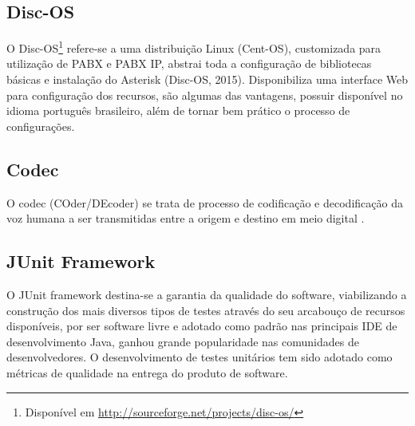 \subsection{Disc-OS}
O Disc-OS\footnote{Disponível em \url{http://sourceforge.net/projects/disc-os/}} refere-se a uma distribuição Linux (Cent-OS), customizada para utilização de PABX e PABX IP, abstrai toda a configuração de bibliotecas básicas e instalação do Asterisk (Disc-OS, 2015). Disponibiliza uma interface Web para configuração dos recursos, são algumas das vantagens, possuir disponível no idioma português brasileiro, além de tornar bem prático o processo de configurações.

\subsection{Codec}
O codec (COder/DEcoder) se trata de processo de codificação e decodificação da voz humana a ser transmitidas entre a origem e destino em meio digital \cite{VIEIRA:2007}.

\subsection{JUnit Framework}
O JUnit framework destina-se a garantia da qualidade do software, viabilizando a construção dos mais diversos tipos de testes através 
do seu arcabouço de recursos disponíveis, por ser software livre e adotado como padrão nas principais IDE de desenvolvimento Java, ganhou grande popularidade nas comunidades de desenvolvedores. O desenvolvimento de testes unitários tem sido adotado como métricas de qualidade na entrega do produto de software. 
